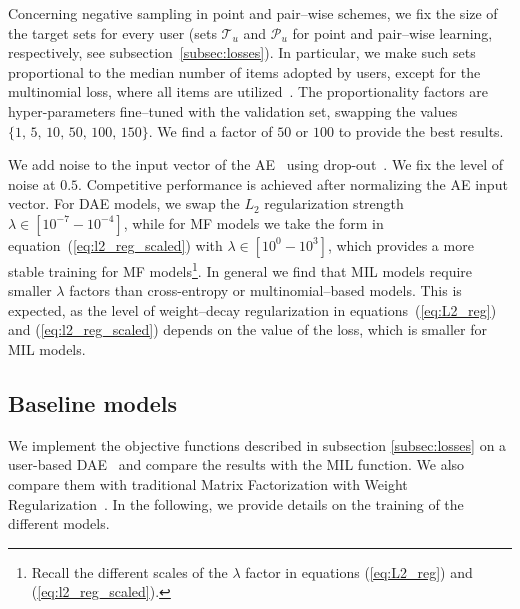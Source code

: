 Concerning negative sampling in point and pair--wise schemes, 
we fix the size of the target sets for every user (sets $\mathcal{T}_u$ and $\mathcal{P}_u$ for point and pair--wise learning, respectively, see subsection~\ref{subsec:losses}).
In particular, we make such sets proportional to the median number of items adopted by users, except for the multinomial loss, where all items are utilized~\cite{Liang:2016:CoFactor}.
The proportionality factors are hyper-parameters fine--tuned with the validation set, swapping the values $\{1,\,5,\,10,\,50,\,100,\,150\}$. We find a factor of $50$ or $100$ to provide the best results.


We add noise to the input vector of the AE~\cite{Vincent:2008:ECRF-AE, Wu:2016:CDAE-topN} using drop-out~\cite{liang:2018:VAE}. We fix the level of noise at $0.5$. Competitive performance is achieved after normalizing the AE input vector.
For DAE models, we swap the $L_2$ regularization strength $\lambda\in[10^{-7}-10^{-4}]$, while for MF models we take the form in equation~(\ref{eq:l2_reg_scaled}) with $\lambda\in[10^{0}-10^{3}]$, which provides a more stable training for MF models\footnote{Recall the different scales of the $\lambda$ factor in equations (\ref{eq:L2_reg}) and (\ref{eq:l2_reg_scaled}).}. In general we find that MIL models require smaller $\lambda$ factors than cross-entropy or multinomial--based models. This is expected, as the level of weight--decay regularization in equations~(\ref{eq:L2_reg}) and (\ref{eq:l2_reg_scaled}) depends on the value of the loss, which is smaller for MIL models.

\subsection{Baseline models}\label{subsec:baseline_models}
We implement the objective functions described in subsection \ref{subsec:losses} on a user-based DAE~\cite{Sedhain:2015:Autorec, Wu:2016:CDAE-topN} and compare the results with the MIL function. We also compare them with traditional Matrix Factorization with Weight Regularization~\cite{HuKoren:2008:CF_implicit}. In the following, we provide details on the training of the different models.

